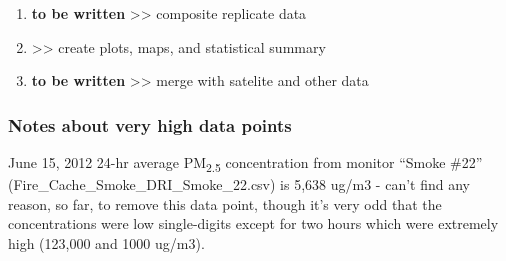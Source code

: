 \begin{enumerate}[nolistsep]
\begin{enumerate}[nolistsep]
	\end{enumerate}

\item \textbf{to be written} >> composite replicate data
\item {} >> create plots, maps, and statistical summary
\item \textbf{to be written} >> merge with satelite and other data
\end{enumerate}

\subsubsection{Notes about very high data points}

June 15, 2012 24-hr average PM\textsubscript{2.5} concentration from monitor ``Smoke \#22'' (Fire\_Cache\_Smoke\_DRI\_Smoke\_22.csv) is 5,638 ug/m3 - can't find any reason, so far, to remove this data point, though it's very odd that the concentrations were low single-digits except for two hours which were extremely high (123,000 and 1000 ug/m3).



